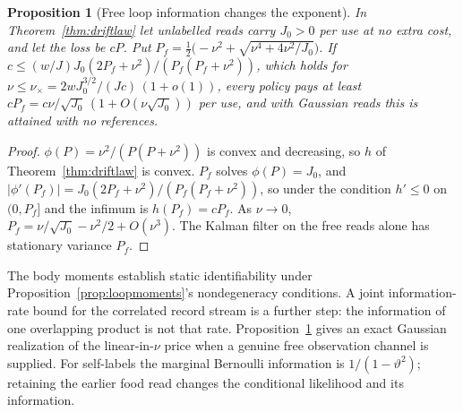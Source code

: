 \documentclass[12pt]{article}
\newtheorem{proposition}[theorem]{Proposition}
\theoremstyle{definition}
\begin{document}
\begin{proposition}[Free loop information changes the exponent]
\label{prop:J0}
In Theorem~\ref{thm:driftlaw} let unlabelled reads carry $J_0>0$ per use at no extra cost, and let the loss be $cP$. Put $P_f=\tfrac12\bigl(-\nu^2+\sqrt{\nu^4+4\nu^2/J_0}\bigr)$. If $c\le(w/J)J_0(2P_f+\nu^2)/(P_f(P_f+\nu^2))$, which holds for $\nu\le\nu_\times=2wJ_0^{3/2}/(Jc)\,(1+o(1))$, every policy pays at least $cP_f=c\nu/\sqrt{J_0}\,(1+O(\nu\sqrt{J_0}))$ per use, and with Gaussian reads this is attained with no references.
\end{proposition}

\begin{proof}
$\phi(P)=\nu^2/(P(P+\nu^2))$ is convex and decreasing, so $h$ of Theorem~\ref{thm:driftlaw} is convex. $P_f$ solves $\phi(P)=J_0$, and $|\phi'(P_f)|=J_0(2P_f+\nu^2)/(P_f(P_f+\nu^2))$, so under the condition $h'\le0$ on $(0,P_f]$ and the infimum is $h(P_f)=cP_f$. As $\nu\to0$, $P_f=\nu/\sqrt{J_0}-\nu^2/2+O(\nu^3)$. The Kalman filter on the free reads alone has stationary variance $P_f$.
\end{proof}

The body moments establish static identifiability under Proposition~\ref{prop:loopmoments}'s nondegeneracy conditions. A joint information-rate bound for the correlated record stream is a further step: the information of one overlapping product is not that rate. Proposition~\ref{prop:J0} gives an exact Gaussian realization of the linear-in-$\nu$ price when a genuine free observation channel is supplied. For self-labels the marginal Bernoulli information is $1/(1-\vartheta^2)$; retaining the earlier food read changes the conditional likelihood and its information.
\end{document}
